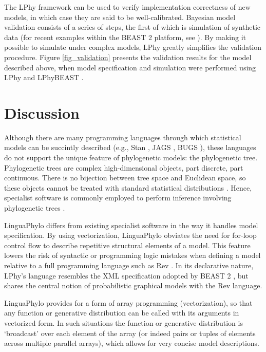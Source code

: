 \documentclass[10pt,letterpaper,table]{article}
\begin{document}
\noindent The LPhy framework can be used to verify implementation correctness of new models, in which case they are said to be well-calibrated.
Bayesian model validation consists of a series of steps, the first of which is simulation of synthetic data (for recent examples within the BEAST 2 platform, see \cite{gaboriau20,chen2022accounting}). 
By making it possible to simulate under complex models, LPhy greatly simplifies the validation procedure.
Figure \ref{fig_validation} presents the validation results for the model described above, when model specification and simulation were performed using LPhy and LPhyBEAST \cite{chen2022accounting}.

\section*{Discussion}
Although there are many
programming languages through which statistical 
models can be succintly described (e.g., Stan
\cite{carpenter2017stan}, JAGS \cite{plummer2003jags}, BUGS
\cite{lunn2009bugs, gilks1994language}), these languages do not
support the unique feature of phylogenetic models: the phylogenetic
tree.
Phylogenetic trees are complex high-dimensional objects, part
discrete, part continuous.
There is no bijection between tree space and Euclidean space, so these
objects cannot be treated with standard statistical distributions \cite{gavryushkin2016space}.
Hence, specialist software is commonly employed to perform inference
involving phylogenetic trees
\cite{hohna2016revbayes,bouckaert2019beastanalysis}.

LinguaPhylo differs from existing specialist software in the way it handles model specification.
By using vectorization, LinguaPhylo obviates the need for for-loop control flow to describe repetitive structural elements of a model.
This feature lowers the risk of syntactic or programming logic mistakes when defining a model relative to a full programming language such as Rev \cite{revbayes}.
In its declarative nature, LPhy's language resembles the XML specification adopted by BEAST 2 \cite{bouckaert2014beast}, but shares the central notion of probabilistic graphical models with the Rev language.

LinguaPhylo provides for a form of array programming (vectorization), so that any function or
generative distribution can be called with its arguments in
vectorized form. In such situations the function or generative distribution is `broadcast' over each element of the array (or indeed pairs or tuples of elements across multiple parallel arrays), which allows for very concise model descriptions.
\end{document}
